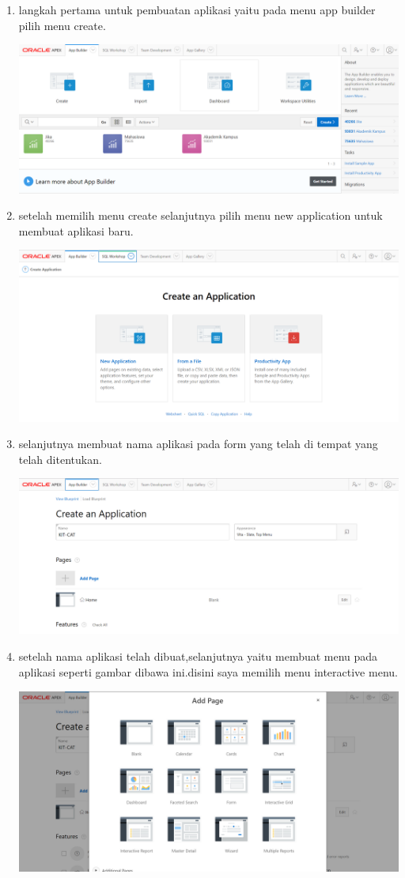 \documentclass[a4paper, 12pt]{article}
\begin{document}
\begin{enumerate}
\item langkah pertama untuk pembuatan aplikasi yaitu pada menu app builder pilih menu create.
    \begin{center}
    \includegraphics[width=.8\textwidth]{figure/1.PNG}
\end{center} 
\item setelah memilih menu create selanjutnya pilih menu new application untuk membuat aplikasi baru.
\begin{center}
    \includegraphics[width=.8\textwidth]{figure/2.PNG}
\end{center} 
\item selanjutnya membuat nama aplikasi pada form yang telah di tempat yang telah ditentukan.
\begin{center}
    \includegraphics[width=.8\textwidth]{figure/3.PNG}
\end{center}
\item setelah nama aplikasi telah dibuat,selanjutnya yaitu membuat menu pada aplikasi seperti gambar dibawa ini.disini saya memilih menu interactive menu.
\begin{center}
    \includegraphics[width=.8\textwidth]{figure/4.PNG}

\end{center}
\end{enumerate}
\end{document}
